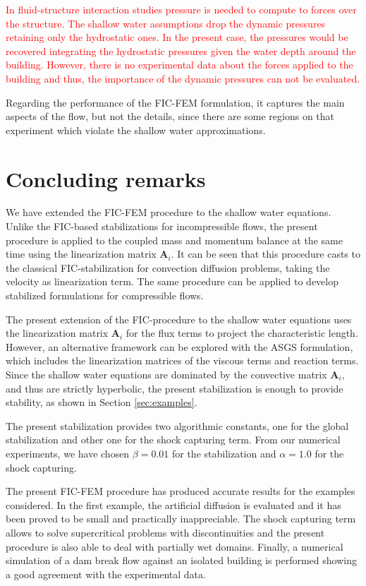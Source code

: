 \documentclass[a4paper,12pt]{elsarticle}
\newcommand{\Miguel}[1]{\textcolor{red}{#1}}
\begin{document}
\Miguel{
In fluid-structure interaction studies pressure is needed to compute to forces over the structure. The shallow water assumptions drop the dynamic pressures retaining only the hydrostatic ones. In the present case, the pressures would be recovered integrating the hydrostatic pressures given the water depth around the building. However, there is no experimental data about the forces applied to the building and thus, the importance of the dynamic pressures can not be evaluated.
}


Regarding the performance of the FIC-FEM formulation, it captures the main aspects of the flow, but not the details, since there are some regions on that experiment which violate the shallow water approximations.


\section{Concluding remarks} \label{sec:conclusions}

We have extended the FIC-FEM procedure to the shallow water equations. Unlike the FIC-based stabilizations for incompressible flows, the present procedure is applied to the coupled mass and momentum balance at the same time using the linearization matrix $\mathbf{A}_i$. It can be seen that this procedure casts to the classical FIC-stabilization for convection diffusion problems, taking the velocity as linearization term. The same procedure can be applied to develop stabilized formulations for compressible flows.

The present extension of the FIC-procedure to the shallow water equations uses the linearization matrix $\mathbf{A}_i$ for the flux terms to project the characteristic length. However, an alternative framework can be explored with the ASGS \cite{hughes1995,codina2008} formulation, which includes the linearization matrices of the viscous terms and reaction terms. Since the shallow water equations are dominated by the convective matrix $\mathbf{A}_i$, and thus are strictly hyperbolic, the present stabilization is enough to provide stability, as shown in Section \ref{sec:examples}.

The present stabilization provides two algorithmic constants, one for the global stabilization and other one for the shock capturing term. From our numerical experiments, we have chosen $\beta=0.01$ for the stabilization and $\alpha=1.0$ for the shock capturing.

The present FIC-FEM procedure has produced accurate results for the examples considered.
In the first example, the artificial diffusion is evaluated and it has been proved to be small and practically inappreciable. The shock capturing term allows to solve supercritical problems with discontinuities and the present procedure is also able to deal with partially wet domains. Finally, a numerical simulation of a dam break flow against an isolated building is performed showing a good agreement with the experimental data.
\end{document}
